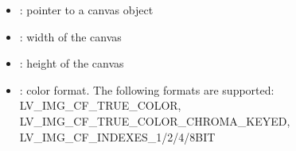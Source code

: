\documentclass[letterpaper,10pt,english]{sphinxmanual}
\begin{document}
\begin{fulllineitems}
\begin{description}
\begin{itemize}
\item {} 
: pointer to a canvas object 

\item {} 
: width of the canvas 

\item {} 
: height of the canvas 

\item {} 
: color format. The following formats are supported: LV\_IMG\_CF\_TRUE\_COLOR, LV\_IMG\_CF\_TRUE\_COLOR\_CHROMA\_KEYED, LV\_IMG\_CF\_INDEXES\_1/2/4/8BIT 

\end{itemize}

\end{description}


\end{fulllineitems}

\end{document}

